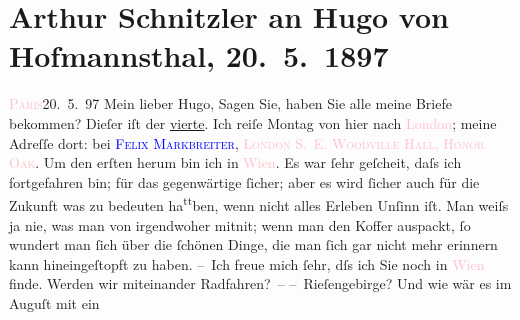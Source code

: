 

               \section[Arthur Schnitzler an Hugo von Hofmannsthal, 20. 5. 1897]{ Arthur Schnitzler an Hugo von Hofmannsthal, 20. 5. 1897}\nopagebreak{}\rehead{ }\normalsize\beginnumbering{} \toendnotes[C]{\smallbreak\pagebreak[2]} 
\toendnotes[C]{\smallbreak}\pstart
           \raggedleft{}{\pb}\textcolor{pink}{\textsc{Paris}}{}\ledrightnote{\textcolor{pink}{Paris}}{ }20. 5. 97\pend
           \pstart
           Mein lieber Hugo, Sagen Sie, haben Sie alle meine Briefe
                    bekommen? Dieſer iſt der \uline{vierte}.\pend
           \pstart
           Ich reiſe Montag von hier nach \textcolor{pink}{London}{}\ledrightnote{\textcolor{pink}{London}}; meine
                    Adreſſe dort: bei \textsc{\textcolor{blue}{Felix Markbreiter}{}\ledrightnote{\textcolor{blue}{Felix Markbreiter}}, \textcolor{pink}{London S. E. Woodville Hall, Honor Oak}{}\ledrightnote{\textcolor{pink}{Honor Oak}}.}\pend
           \pstart
           Um den erſten herum bin ich in \textcolor{pink}{Wien}{}\ledrightnote{\textcolor{pink}{Wien}}.
                    Es war ſehr geſcheit, daſs ich fortgefahren bin; für {\pb}das gegenwärtige ſicher; aber es wird ſicher auch für die Zukunft was zu
                    bedeuten ha\substVorne{}\textsuperscript{tt}\substDazwischen{}b\substHinten{}en, wenn nicht alles Erleben Unſinn iſt. Man weiſs ja nie, was man von
                    irgendwoher mitni{\geminationm}t; wenn man den Koffer auspackt,
                    ſo wundert man ſich über die ſchönen Dinge, die man ſich gar nicht mehr erinnern
                        {\pb}kann hineingeſtopft zu haben.\pend
           \pstart
           – Ich freue mich ſehr, dſs ich Sie noch in \textcolor{pink}{Wien}{}\ledrightnote{\textcolor{pink}{Wien}}
                    finde. Werden wir miteinander Radfahren? – – Rieſengebirge? Und wie wär es im Auguſt mit ein
